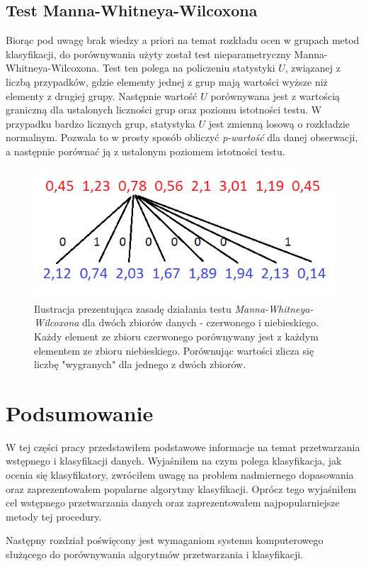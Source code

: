 \documentclass[../thesis.tex]{subfiles}
\begin{document}
\subsection{Test Manna-Whitneya-Wilcoxona}

Biorąc pod uwagę brak wiedzy a priori na temat rozkładu ocen w grupach metod klasyfikacji, do porównywania użyty został test nieparametryczny Manna-Whitneya-Wilcoxona. Test ten polega na policzeniu statystyki $U$, związanej z liczbą przypadków, gdzie elementy jednej z grup mają wartości wyższe niż elementy z drugiej grupy. Następnie wartość $U$ porównywana jest z wartością graniczną dla ustalonych liczności grup oraz poziomu istotności testu. W przypadku bardzo licznych grup, statystyka $U$ jest zmienną losową o rozkładzie normalnym. Pozwala to w prosty sposób obliczyć \emph{p-wartość} dla danej obserwacji, a następnie porównać ją z ustalonym poziomem istotności testu.

\begin{figure}[h]
\centering
\includegraphics[height=.15\textheight]{umann.png}
\caption{Ilustracja prezentująca zasadę działania testu \emph{Manna-Whitneya-Wilcoxona} dla dwóch zbiorów danych - czerwonego i niebieskiego. Każdy element ze zbioru czerwonego porównywany jest z każdym elementem ze zbioru niebieskiego. Porównując wartości zlicza się liczbę "wygranych" dla jednego z dwóch zbiorów. }
\label{classification:umann}
\end{figure}

\section{Podsumowanie}

W tej części pracy przedstawiłem podstawowe informacje na temat przetwarzania wstępnego i klasyfikacji danych. Wyjaśniłem na czym polega klasyfikacja, jak ocenia się klasyfikatory, zwróciłem uwagę na problem nadmiernego dopasowania oraz zaprezentowałem popularne algorytmy klasyfikacji. Oprócz tego wyjaśniłem cel wstępnego przetwarzania danych oraz zaprezentowałem najpopularniejsze metody tej procedury.

Następny rozdział poświęcony jest wymaganiom systemu komputerowego służącego do porównywania algorytmów przetwarzania i klasyfikacji.
\end{document}
